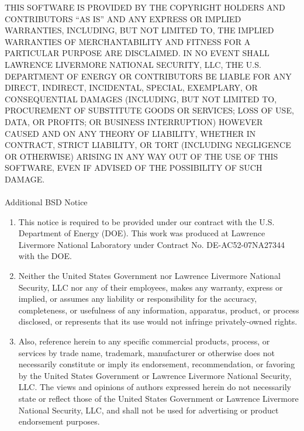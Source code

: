 THIS SOFTWARE IS PROVIDED BY THE COPYRIGHT HOLDERS AND CONTRIBUTORS 
``AS IS'' AND ANY EXPRESS OR IMPLIED WARRANTIES, INCLUDING, BUT NOT 
LIMITED TO, THE IMPLIED WARRANTIES OF MERCHANTABILITY AND FITNESS 
FOR A PARTICULAR PURPOSE ARE DISCLAIMED. IN NO EVENT SHALL 
LAWRENCE LIVERMORE NATIONAL SECURITY, LLC, THE U.S. DEPARTMENT OF 
ENERGY OR CONTRIBUTORS BE LIABLE FOR ANY DIRECT, INDIRECT, INCIDENTAL, 
SPECIAL, EXEMPLARY, OR CONSEQUENTIAL DAMAGES (INCLUDING, BUT NOT LIMITED 
TO, PROCUREMENT OF SUBSTITUTE GOODS OR SERVICES; LOSS OF USE, 
DATA, OR PROFITS; OR BUSINESS INTERRUPTION) HOWEVER CAUSED AND ON ANY 
THEORY OF LIABILITY, WHETHER IN CONTRACT, STRICT LIABILITY, OR TORT 
(INCLUDING NEGLIGENCE OR OTHERWISE) ARISING IN ANY WAY OUT OF THE USE 
OF THIS SOFTWARE, EVEN IF ADVISED OF THE POSSIBILITY OF SUCH DAMAGE.
\\
\\
Additional BSD Notice
\begin{enumerate}
\item{} 
This notice is required to be provided under our contract with
the U.S. Department of Energy (DOE). This work was produced at
Lawrence Livermore National Laboratory under Contract 
No. DE-AC52-07NA27344 with the DOE.

\item{} 
Neither the United States Government nor Lawrence Livermore 
National Security, LLC nor any of their employees, makes any warranty, 
express or implied, or assumes any liability or responsibility for the
accuracy, completeness, or usefulness of any information, apparatus,
product, or process disclosed, or represents that its use would not
infringe privately-owned rights.

\item{} 
Also, reference herein to any specific commercial products, process, 
or services by trade name, trademark, manufacturer or otherwise does 
not necessarily constitute or imply its endorsement, recommendation, 
or favoring by the United States Government or Lawrence Livermore 
National Security, LLC. The views and opinions of authors expressed 
herein do not necessarily state or reflect those of the United States 
Government or Lawrence Livermore National Security, LLC, and shall 
not be used for advertising or product endorsement purposes.

\end{enumerate}
